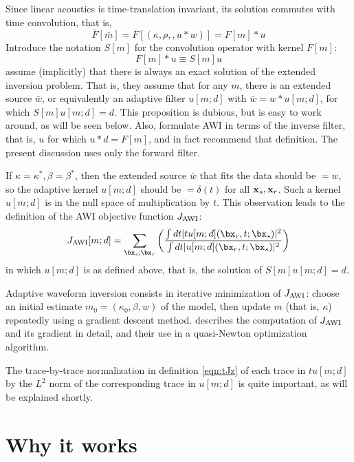 Since linear acoustics is time-translation invariant, its solution commutes with time convolution, that is,
\[
 \bar{F}[\bar{m}] = \bar{F}[(\kappa,\rho,,u*w)] = F[m]*u
\]
Introduce the notation $S[m]$ for the convolution operator with kernel $F[m]$:
\begin{equation}
  \label{eqn:sdef}
  F[m]*u \equiv S[m]u
\end{equation}
\cite{Warner:16} assume (implicitly) that there is always an exact
solution of the extended inversion problem. That is, they assume that
for any $m$, there is an extended source $\bar{w}$, or equivalently an
adaptive filter $u[m;d]$ with $\bar{w}=w*u[m;d]$, for which
$S[m]u[m;d]= d$. This proposition is dubious, but is easy to work
around, as will be seen below. Also, \cite{Warner:16} formulate
AWI in terms of the inverse filter, that is, $u$ for which
$u*d = F[m]$, and in fact recommend that definition. The present
discussion uses only the forward filter.

If $\kappa = \kappa^*, \beta = \beta^*$, then the extended source
$\bar{w}$ that fits the data should be $= w$,
so the adaptive kernel $u[m;d]$ should be $=\delta(t)$ for all
${\bf x}_s,{\bf x}_r$. Such a kernel $u[m;d]$ is in the null space of
multiplication by $t$.
This observation leads to the definition of the AWI objective function $J_{\rm AWI}$:
\begin{equation}
  \label{eqn:tJz}
  J_{\rm AWI}[m;d] = \sum_{\bx_s,\bx_r} \left(\frac{\int dt |tu[m;d](\bx_r,t;\bx_s)|^2}{\int dt |u[m;d](\bx_r,t;\bx_s)|^2}\right)
\end{equation}
in which $u[m;d]$ is as defined above, that is, the solution of $S[m]u[m;d]
= d$.

Adaptive waveform inversion consists in iterative minimization of
$J_{\rm AWI}$: choose an initial estimate $m_0=(\kappa_0,\beta, w)$ of the
model, then update $m$ (that is, $\kappa$) repeatedly using a gradient
descent method. \cite{Warner:16} describes the computation of $J_{\rm AWI}$
and its gradient in detail, and their use in a quasi-Newton
optimization algorithm.

The trace-by-trace normalization in definition \ref{eqn:tJz} of each
trace in $tu[m;d]$ by the
$L^2$ norm of the corresponding trace in $u[m;d]$ is quite important, as will be explained shortly.

\section{Why it works}

